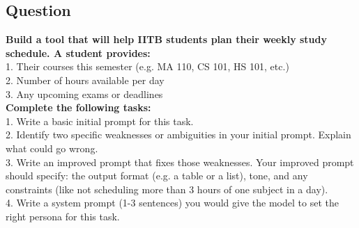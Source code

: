 \documentclass{article}
\begin{document}
\subsection{Question}
\textbf{Build a tool that will help IITB students plan their weekly study
schedule. A student provides:}\\
\hspace*{15pt}1. Their courses this semester (e.g. MA 110, CS 101, HS 101, etc.)\\
\hspace*{15pt}2. Number of hours available per day\\
\hspace*{15pt}3. Any upcoming exams or deadlines\\
\textbf{Complete the following tasks:}\\
\hspace*{15pt}1. Write a basic initial prompt for this task.\\
\hspace*{15pt}2. Identify two specific weaknesses or ambiguities in your initial prompt. Explain what could go wrong.\\
\hspace*{15pt}3. Write an improved prompt that fixes those weaknesses. Your improved prompt should specify: the output format (e.g. a table or a list), tone, and any constraints (like not scheduling more than 3 hours of one subject in a day).\\
\hspace*{15pt}4. Write a system prompt (1-3 sentences) you would give the model to set the right persona for this task.\\
\end{document}

